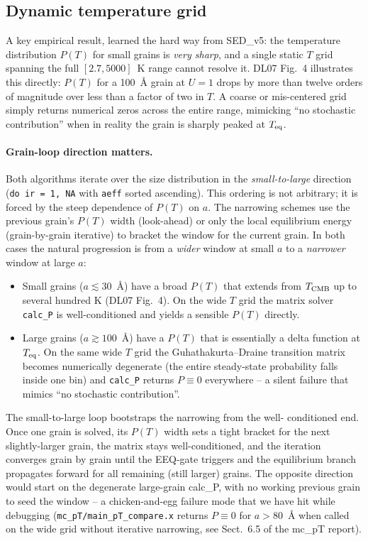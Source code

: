 \documentclass{my_memo}
\newcommand{\Teq}{\ensuremath{T_{\rm eq}}}
\begin{document}
\subsection{Dynamic temperature grid}\label{sec:dynamicT}

A key empirical result, learned the hard way from SED\_v5: the
temperature distribution $P(T)$ for small grains is \emph{very sharp},
and a single static $T$ grid spanning the full $[2.7, 5000]$~K range
cannot resolve it. DL07 Fig.~4 illustrates this directly: $P(T)$ for a
\SI{100}{\angstrom} grain at $U = 1$ drops by more than twelve orders
of magnitude over less than a factor of two in $T$. A coarse or
mis-centered grid simply returns numerical zeros across the entire
range, mimicking ``no stochastic contribution'' when in reality the
grain is sharply peaked at $\Teq$.

\paragraph{Grain-loop direction matters.}
Both algorithms iterate over the size distribution in the
\emph{small-to-large} direction (\texttt{do ir = 1, NA} with
\texttt{aeff} sorted ascending). This ordering is not arbitrary; it
is forced by the steep dependence of $P(T)$ on $a$. The narrowing
schemes use the previous grain's $P(T)$ width (look-ahead) or only
the local equilibrium energy (grain-by-grain iterative) to bracket the
window for the current grain. In both cases the natural progression
is from a \emph{wider} window at small $a$ to a \emph{narrower}
window at large $a$:
\begin{itemize}
  \item Small grains ($a \lesssim 30$~\AA) have a broad $P(T)$ that
        extends from $T_{\rm CMB}$ up to several hundred K (DL07
        Fig.~4). On the wide $T$ grid the matrix solver
        \texttt{calc\_P} is well-conditioned and yields a sensible
        $P(T)$ directly.
  \item Large grains ($a \gtrsim 100$~\AA) have a $P(T)$ that is
        essentially a delta function at $\Teq$. On the same wide $T$
        grid the Guhathakurta--Draine transition matrix becomes
        numerically degenerate (the entire steady-state probability
        falls inside one bin) and \texttt{calc\_P} returns $P \equiv
        0$ everywhere -- a silent failure that
        mimics ``no stochastic contribution''.
\end{itemize}
The small-to-large loop bootstraps the narrowing from the well-
conditioned end. Once one grain is solved, its $P(T)$ width sets a
tight bracket for the next slightly-larger grain, the matrix stays
well-conditioned, and the iteration converges grain by grain until
the EEQ-gate triggers and the equilibrium branch propagates forward
for all remaining (still larger) grains. The opposite direction would
start on the degenerate large-grain calc\_P, with no working previous
grain to seed the window -- a chicken-and-egg failure mode that we
have hit while debugging
(\texttt{mc\_pT/main\_pT\_compare.x} returns $P \equiv 0$ for
$a > 80$~\AA{} when called on the wide grid without iterative
narrowing, see Sect.~6.5 of the mc\_pT report).
\end{document}
